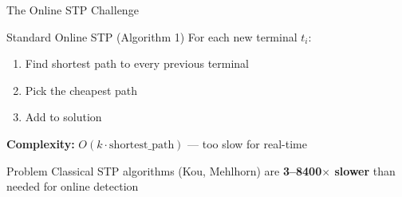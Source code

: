\documentclass[11pt, aspectratio=169]{beamer}
\begin{document}
\begin{frame}{The Online STP Challenge}
    \begin{block}{Standard Online STP (Algorithm 1)}
        For each new terminal $t_i$:
        \begin{enumerate}
            \item Find shortest path to every previous terminal
            \item Pick the cheapest path
            \item Add to solution
        \end{enumerate}
        \textbf{Complexity:} $O(k \cdot \text{shortest\_path})$ — too slow for real-time
    \end{block}
    \begin{alertblock}{Problem}
        Classical STP algorithms (Kou, Mehlhorn) are \textbf{3–8400$\times$ slower} than needed for online detection
    \end{alertblock}
\end{frame}
\end{document}
